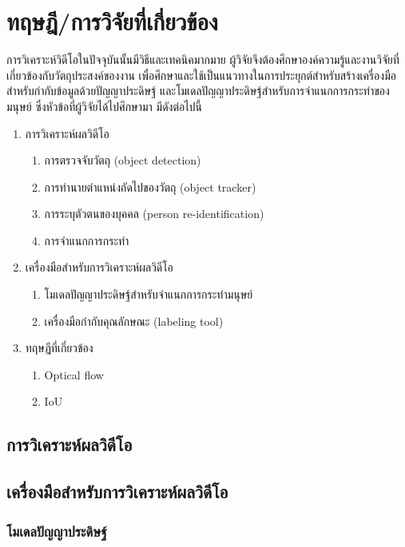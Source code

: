 \clearpage
\chapter{ทฤษฎี/การวิจัยที่เกี่ยวข้อง}
การวิเคราะห์วิดีโอในปัจจุบันนั้นมีวิธีและเทคนิคมากมาย ผู้วิจัยจึงต้องศึกษาองค์ความรู้และงานวิจัยที่เกี่ยวข้องกับวัตถุประสงค์ของงาน 
เพื่อศึกษาและใช้เป็นแนวทางในการประยุกต์สำหรับสร้างเครื่องมือสำหรับกำกับข้อมูลด้วยปัญญาประดิษฐ์ และโมเดลปัญญาประดิษฐ์สำหรับการจำแนกการกระทำของมนุษย์ 
ซึ่งหัวข้อที่ผู้วิจัยได้ไปศึกษามา มีดังต่อไปนี้
\begin{enumerate}
	\setlength\itemsep{-0.25em}
	\item การวิเคราะห์ผลวิดีโอ
	\begin{enumerate}	
		\item การตรวจจับวัตถุ (object detection)
		\item การทำนายตำแหน่งถัดไปของวัตถุ (object tracker)
		\item การระบุตัวตนของบุคคล (person re-identification)
		\item การจำแนกการกระทำ
	\end{enumerate}
	\setlength\itemsep{-0.25em}
	\item เครื่องมือสำหรับการวิเคราะห์ผลวิดีโอ
	\begin{enumerate}	
		\item โมเดลปัญญาประดิษฐ์สำหรับจำแนกการกระทำมนุษย์
		\item เครื่องมือกำกับคุณลักษณะ (labeling tool)
	\end{enumerate}
	\item ทฤษฎีที่เกี่ยวข้อง
	\begin{enumerate}	
		\item Optical flow
		\item IoU
	\end{enumerate}
\end{enumerate}

\section{การวิเคราะห์ผลวิดีโอ}


\section{เครื่องมือสำหรับการวิเคราะห์ผลวิดีโอ}
\subsection{โมเดลปัญญาประดิษฐ์}

